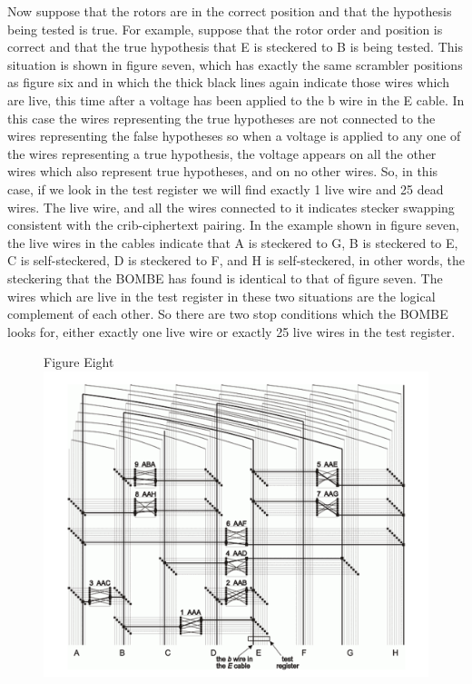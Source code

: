 \documentclass[12pt,a4paper]{article}
\begin{document}
Now suppose that the rotors are in the correct position and that the hypothesis being tested is true. For example, suppose that the rotor order and position is correct and that the true hypothesis that E is steckered to B is being tested. This situation is shown in figure seven, which has exactly the same scrambler positions as figure six and in which the thick black lines again indicate those wires which are live, this time after a voltage has been applied to the b wire in the E cable. In this case the wires representing the true hypotheses are not connected to the wires representing the false hypotheses so when a voltage is applied to any one of the wires representing a true hypothesis, the voltage appears on all the other wires which also represent true hypotheses, and on no other wires. So, in this case, if we look in the test register we will find exactly 1 live wire and 25 dead wires. The live wire, and all the wires connected to it indicates stecker swapping consistent with the crib-ciphertext pairing. In the example shown in figure seven, the live wires in the cables indicate that A is steckered to G, B is steckered to E, C is self-steckered, D is steckered to F, and H is self-steckered, in other words, the steckering that the BOMBE has found is identical to that of figure seven. The wires which are live in the test register in these two situations are the logical complement of each other. So there are two stop conditions which the BOMBE looks for, either exactly one live wire or exactly 25 live wires in the test register.

\begin{figure}[h]
\centering
Figure Eight
\includegraphics[width=\textwidth]{BOMBEfive.png}
\end{figure}
\end{document}

